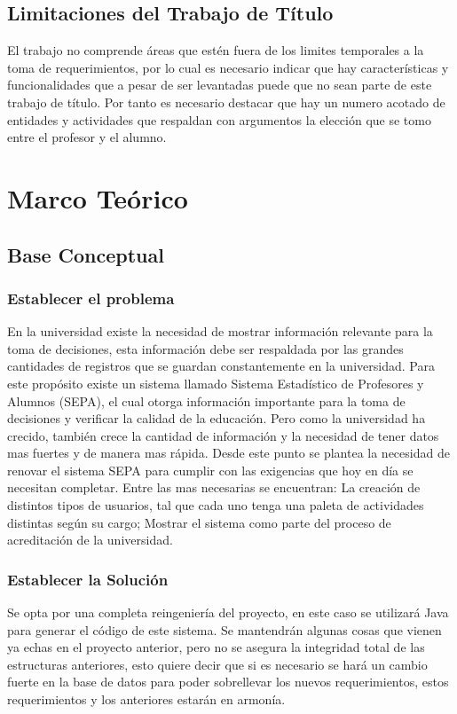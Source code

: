 \documentclass[a4paper,12pt,openany,oneside]{book}
\begin{document}
\section{Limitaciones del Trabajo de Título}
El trabajo no comprende áreas que estén fuera de los limites temporales a la toma de requerimientos, por lo cual es necesario indicar que hay características y funcionalidades que a pesar de ser levantadas puede que no sean parte de este trabajo de título. Por tanto es necesario destacar que hay un numero acotado de entidades y actividades que respaldan con argumentos la elección que se tomo entre el profesor y el alumno.
\chapter{Marco Teórico}
\thispagestyle{empty}
\section{Base Conceptual}
\subsection{Establecer el problema}
En la universidad existe la necesidad de mostrar información relevante para la toma de decisiones, esta información debe ser respaldada por las grandes cantidades de registros que se guardan constantemente en la universidad. Para este propósito existe un sistema llamado Sistema Estadístico de Profesores y Alumnos (SEPA), el cual otorga información importante para la toma de decisiones y verificar la calidad de la educación. Pero como la universidad ha crecido, también crece la cantidad de información y la necesidad de tener datos mas fuertes y de manera mas rápida. Desde este punto se plantea la necesidad de renovar el sistema SEPA para cumplir con las exigencias que hoy en día se necesitan completar. Entre las mas necesarias se encuentran: La creación de distintos tipos de usuarios, tal que cada uno tenga una paleta de actividades distintas según su cargo; Mostrar el sistema como parte del proceso de acreditación de la universidad.
\subsection{Establecer la Solución}
Se opta por una completa reingeniería del proyecto, en este caso se utilizará Java para generar el código de este sistema. Se mantendrán algunas cosas que vienen ya echas en el proyecto anterior, pero no se asegura la integridad total de las estructuras anteriores, esto quiere decir que si es necesario se hará un cambio fuerte en la base de datos para poder sobrellevar los nuevos requerimientos, estos requerimientos y los anteriores estarán en armonía.
\end{document}
